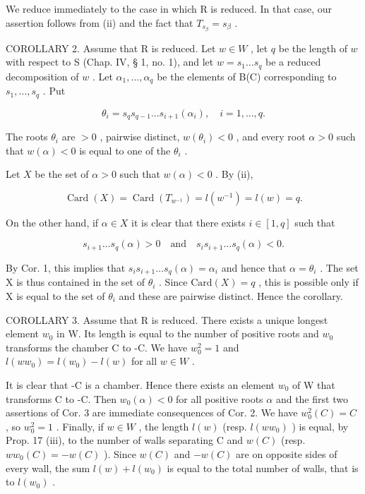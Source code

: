 We reduce immediately to the case in which R is reduced. In that case, our assertion follows from (ii) and the fact that \(T_{s_{\beta}} = s_{\beta}\) .

COROLLARY 2. Assume that R is reduced. Let \(w \in W\) , let \(q\) be the length of \(w\) with respect to S (Chap. IV, § 1, no. 1), and let \(w = s_1 \ldots s_q\) be a reduced decomposition of \(w\) . Let \(\alpha_1, \ldots, \alpha_q\) be the elements of B(C) corresponding to \(s_1, \ldots, s_q\) . Put

\[
\theta_ {i} = s _ {q} s _ {q - 1} \dots s _ {i + 1} (\alpha_ {i}), \quad i = 1, \dots , q.
\]

The roots \(\theta_{i}\) are \(>0\) , pairwise distinct, \(w(\theta_{i}) < 0\) , and every root \(\alpha > 0\) such that \(w(\alpha) < 0\) is equal to one of the \(\theta_{i}\) .

Let \(X\) be the set of \(\alpha > 0\) such that \(w(\alpha) < 0\) . By (ii),

\[
\operatorname{Card} (X) = \operatorname{Card} \left(T _ {w ^ {- 1}}\right) = l \left(w ^ {- 1}\right) = l (w) = q.
\]

On the other hand, if \(\alpha \in X\) it is clear that there exists \(i \in [1, q]\) such that

\[
s _ {i + 1} \ldots s _ {q} (\alpha) > 0 \quad \text {and} \quad s _ {i} s _ {i + 1} \ldots s _ {q} (\alpha) <   0.
\]

By Cor. 1, this implies that \(s_i s_{i+1} \ldots s_q(\alpha) = \alpha_i\) and hence that \(\alpha = \theta_i\) . The set X is thus contained in the set of \(\theta_i\) . Since \(\text{Card}(X) = q\) , this is possible only if X is equal to the set of \(\theta_i\) and these are pairwise distinct. Hence the corollary.

COROLLARY 3. Assume that R is reduced. There exists a unique longest element \(w_0\) in W. Its length is equal to the number of positive roots and \(w_0\) transforms the chamber C to -C. We have \(w_0^2 = 1\) and \(l(ww_0) = l(w_0) - l(w)\) for all \(w \in W\) .

It is clear that -C is a chamber. Hence there exists an element \(w_{0}\) of W that transforms C to -C. Then \(w_{0}(\alpha) < 0\) for all positive roots \(\alpha\) and the first two assertions of Cor. 3 are immediate consequences of Cor. 2. We have \(w_{0}^{2}(C) = C\) , so \(w_{0}^{2} = 1\) . Finally, if \(w \in W\) , the length \(l(w)\) (resp. \(l(ww_{0})\) ) is equal, by Prop. 17 (iii), to the number of walls separating C and \(w(C)\) (resp. \(ww_{0}(C) = -w(C)\) ). Since \(w(C)\) and \(-w(C)\) are on opposite sides of every wall, the sum \(l(w) + l(w_{0})\) is equal to the total number of walls, that is to \(l(w_{0})\) .

